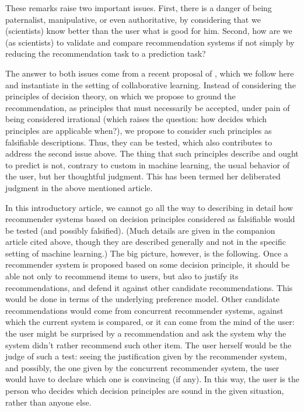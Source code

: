 \documentclass[version=last, pagesize, twoside=off, bibliography=totoc, DIV=calc, fontsize=14pt, a4paper, french, english]{scrartcl}
\begin{document}
These remarks raise two important issues. First, there is a danger of being paternalist, manipulative, or even authoritative, by considering that we (scientists) know better than the user what is good for him. Second, how are we (as scientists) to validate and compare recommendation systems if not simply by reducing the recommendation task to a prediction task?

The answer to both issues come from a recent proposal of \citet{cailloux_formal_2017}, which we follow here and instantiate in the setting of collaborative learning. Instead of considering the principles of decision theory, on which we propose to ground the recommendation, as principles that must necessarily be accepted, under pain of being considered irrational (which raises the question: how decides which principles are applicable when?), we propose to consider such principles as falsifiable descriptions. Thus, they can be tested, which also contributes to address the second issue above. The thing that such principles describe and ought to predict is not, contrary to custom in machine learning, the usual behavior of the user, but her thoughtful judgment. This has been termed her deliberated judgment in the above mentioned article.

In this introductory article, we cannot go all the way to describing in detail how recommender systems based on decision principles considered as falsifiable would be tested (and possibly falsified). (Much details are given in the companion article cited above, though they are described generally and not in the specific setting of machine learning.) The big picture, however, is the following. Once a recommender system is proposed based on some decision principle, it should be able not only to recommend items to users, but also to justify its recommendations, and defend it against other candidate recommendations. This would be done in terms of the underlying preference model. Other candidate recommendations would come from concurrent recommender systems, against which the current system is compared, or it can come from the mind of the user: the user might be surprised by a recommendation and ask the system why the system didn’t rather recommend such other item. The user herself would be the judge of such a test: seeing the justification given by the recommender system, and possibly, the one given by the concurrent recommender system, the user would have to declare which one is convincing (if any). In this way, the user is the person who decides which decision principles are sound in the given situation, rather than anyone else.
\end{document}
